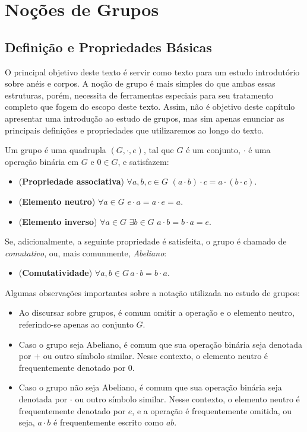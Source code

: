 \chapter{Noções de Grupos}


\section{Definição e Propriedades Básicas}

O principal objetivo deste texto é servir como texto para um estudo introdutório sobre anéis e corpos.
A noção de grupo é mais simples do que ambas essas estruturas, porém, necessita de ferramentas especiais para seu tratamento completo que fogem do escopo deste texto.
Assim, não é objetivo deste capítulo apresentar uma introdução ao estudo de grupos, mas sim apenas enunciar as principais definições e propriedades que utilizaremos ao longo do texto.

\begin{definition}
Um grupo é uma quadrupla $(G,\cdot,e)$, tal que $G$ é um conjunto, $\cdot$ é uma operação binária em $G$ e $0 \in G$, e satisfazem:

\begin{itemize}
    \item (\textbf{Propriedade associativa}) $\forall a, b, c \in G$ $(a \cdot b) \cdot c = a \cdot (b \cdot c)$.
    \item (\textbf{Elemento neutro}) $\forall a \in G$  $e \cdot a = a \cdot e = a$.
    \item (\textbf{Elemento inverso}) $\forall a \in G$ $\exists b \in G$ $a \cdot b = b \cdot a = e$.
\end{itemize}
Se, adicionalmente, a seguinte propriedade é satisfeita, o grupo é chamado de \emph{comutativo}, ou, mais comunmente, \emph{Abeliano}:
\begin{itemize}
    \item (\textbf{Comutatividade}) $\forall a, b \in G\, a \cdot b = b \cdot a$.
\end{itemize}
\end{definition}
Algumas observações importantes sobre a notação utilizada no estudo de grupos:
\begin{itemize}
\item Ao discursar sobre grupos, é comum omitir a operação e o elemento neutro, referindo-se apenas ao conjunto $G$.
\item Caso o grupo seja Abeliano, é comum que sua operação binária seja denotada por $+$ ou outro símbolo similar. Nesse contexto, o elemento neutro é frequentemente denotado por $0$.
\item Caso o grupo não seja Abeliano, é comum que sua operação binária seja denotada por $\cdot$ ou outro símbolo similar. Nesse contexto, o elemento neutro é frequentemente denotado por $e$, e a operação é frequentemente omitida, ou seja, $a \cdot b$ é frequentemente escrito como $ab$.
\end{itemize}

